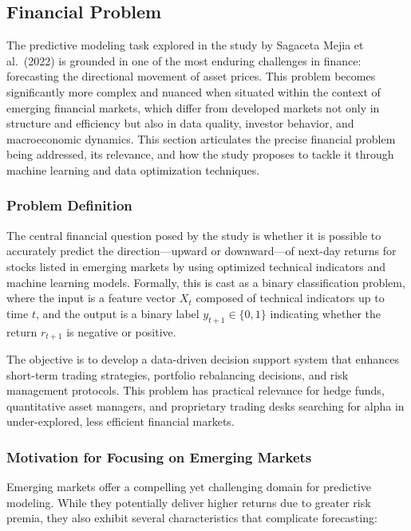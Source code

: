 \subsection{Financial Problem}

The predictive modeling task explored in the study by Sagaceta Mejia et al.\ (2022) is grounded in one of the most enduring challenges in finance: forecasting the directional movement of asset prices. This problem becomes significantly more complex and nuanced when situated within the context of emerging financial markets, which differ from developed markets not only in structure and efficiency but also in data quality, investor behavior, and macroeconomic dynamics. This section articulates the precise financial problem being addressed, its relevance, and how the study proposes to tackle it through machine learning and data optimization techniques.

\subsubsection{Problem Definition}

The central financial question posed by the study is whether it is possible to accurately predict the direction---upward or downward---of next-day returns for stocks listed in emerging markets by using optimized technical indicators and machine learning models. Formally, this is cast as a binary classification problem, where the input is a feature vector $X_t$ composed of technical indicators up to time $t$, and the output is a binary label $y_{t+1} \in \{0, 1\}$ indicating whether the return $r_{t+1}$ is negative or positive.

The objective is to develop a data-driven decision support system that enhances short-term trading strategies, portfolio rebalancing decisions, and risk management protocols. This problem has practical relevance for hedge funds, quantitative asset managers, and proprietary trading desks searching for alpha in under-explored, less efficient financial markets.

\subsubsection{Motivation for Focusing on Emerging Markets}

Emerging markets offer a compelling yet challenging domain for predictive modeling. While they potentially deliver higher returns due to greater risk premia, they also exhibit several characteristics that complicate forecasting:

